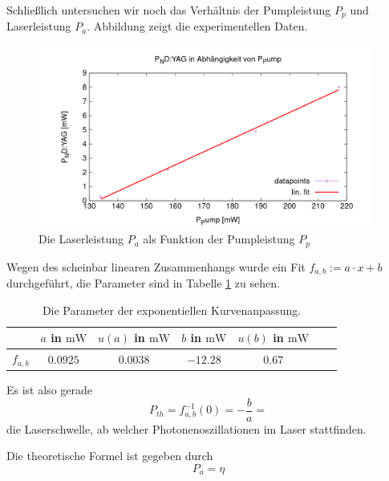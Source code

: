 \documentclass[../../../main.tex]{subfiles}
\begin{document}
    Schließlich untersuchen wir noch das Verhältnis der Pumpleistung $P_p$ und Laserleistung $P_a$. Abbildung zeigt die experimentellen Daten.

    \begin{figure}[H]
        \centering
        \includegraphics[width=11cm]{../../Bilddateien/5/P(NDYAG)overP(Pump).png}
        \caption{Die Laserleistung $P_a$ als Funktion der Pumpleistung $P_p$}
        \label{fig:PumpLaserLeistung}
    \end{figure}

    Wegen des scheinbar linearen Zusammenhangs wurde ein Fit $f_{a,b} := a\cdot x + b$ durchgeführt, die Parameter sind in Tabelle \ref{tab:PumpLaserLeistungFitParameter} zu sehen.

    \begin{table}[H]
        \centering
        \begin{tabular}{c|cc|cc|cc}
            \hline
             & $a$ in $\si{\m\W}$ & $u(a)$ in $\si{\m\W}$ & $b$ in $\si{\m\W}$ & $u(b)$ in $\si{\m\W}$ \\
            \hline\hline
            $f_{a, b}$ & $0.0925$ & $0.0038$ & $-12.28$ & $0.67$\\
            \hline
        \end{tabular}
        \caption{Die Parameter der exponentiellen Kurvenanpassung.}
        \label{tab:PumpLaserLeistungFitParameter}
    \end{table}

    Es ist also gerade
    \[
        P_{th} = f^{-1}_{a, b}(0) = -\frac{b}{a} = 
    \]
    die Laserschwelle, ab welcher Photonenoszillationen im Laser stattfinden.

    Die theoretische Formel ist gegeben durch 
    \[
        P_a = \eta    
    \]
\end{document}
